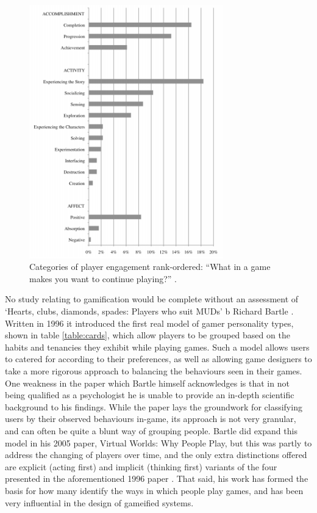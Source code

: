 \documentclass[12pt]{article}
\begin{document}
\begin{figure}[p]
	\includegraphics[width=0.75\textwidth]{../img/fog.png}
	\caption{Categories of player engagement rank-ordered: ``What in a game makes you want to continue playing?'' \cite{schoenau2011player}.}
	\label{fog}
\end{figure}

No study relating to gamification would be complete without an assessment of `Hearts, clubs, diamonds, spades: Players who suit MUDs' b Richard Bartle \cite{bartle1996hearts}. Written in 1996 it introduced the first real model of gamer personality types, shown in table \ref{table:cards}, which allow players to be grouped based on the habits and tenancies they exhibit while playing games. Such a model allows users to catered for according to their preferences, as well as allowing game designers to take a more rigorous approach to balancing the behaviours seen in their games.  One weakness in the paper which Bartle himself acknowledges is that in not being qualified as a psychologist he is unable to provide an in-depth scientific background to his findings. While the paper lays the groundwork for classifying users by their observed behaviours in-game, its approach is not very granular, and can often be quite a blunt way of grouping people. Bartle did expand this model in his 2005 paper, Virtual Worlds: Why People Play, but this was partly to address the changing of players over time, and the only extra distinctions offered are explicit (acting first) and implicit (thinking first) variants of the four presented in the aforementioned 1996 paper \cite{bartle2005play}. That said, his work has formed the basis for how many identify the ways in which people play games, and has been very influential in the design of gameified systems.
\end{document}
